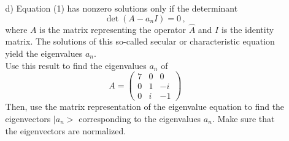 \documentclass[11pt]{article}
\begin{document}
\begin{itemize}
\begin{itemize}
\begin{equation}
\end{equation}
\item[d)]
Equation (1) has nonzero solutions only if the determinant
\begin{displaymath}
\det(A - a_n I) = 0\, ,
\end{displaymath}
where $A$ is the matrix representing the operator ${\hat A}$ and $I$ is the identity matrix.
The solutions of this so-called secular or characteristic equation yield the eigenvalues $a_n$.\\
Use this result to find the eigenvalues $a_n$ of
\begin{displaymath}
A =
\begin{pmatrix}
7 & 0 & 0 \\
0 & 1 & -i \\
0 & i & -1
\end{pmatrix}
\end{displaymath}
Then, use the matrix representation of the eigenvalue equation to find the eigenvectors $|a_n>$ corresponding to the eigenvalues $a_n$. Make sure that the eigenvectors are normalized.
\end{itemize}
%
\end{itemize}
\end{document}
